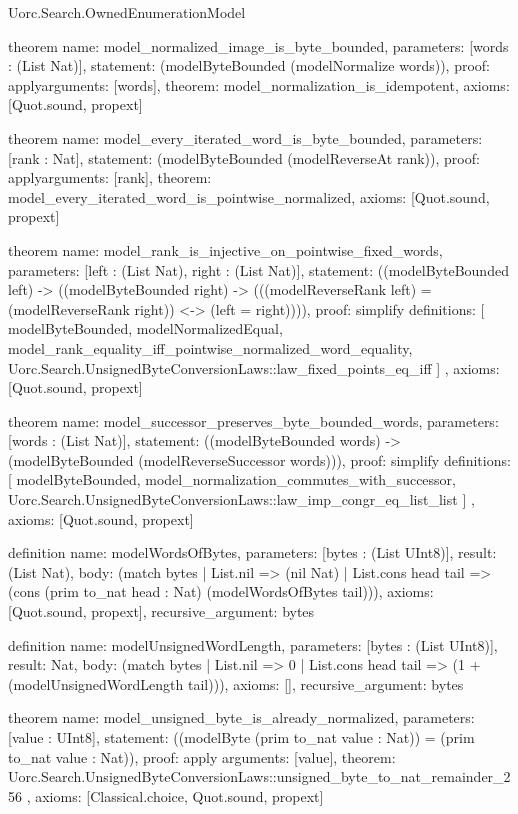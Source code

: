 \begin{lexlean}{Uorc.Search.OwnedEnumerationModel}
\begin{semanticmodule}
theorem{
  name: model_normalized_image_is_byte_bounded,
  parameters: [words : (List Nat)],
  statement: (modelByteBounded (modelNormalize words)),
  proof: apply{arguments: [words], theorem: model_normalization_is_idempotent},
  axioms: [Quot.sound, propext]
}

theorem{
  name: model_every_iterated_word_is_byte_bounded,
  parameters: [rank : Nat],
  statement: (modelByteBounded (modelReverseAt rank)),
  proof: apply{arguments: [rank], theorem: model_every_iterated_word_is_pointwise_normalized},
  axioms: [Quot.sound, propext]
}

theorem{
  name: model_rank_is_injective_on_pointwise_fixed_words,
  parameters: [left : (List Nat), right : (List Nat)],
  statement: ((modelByteBounded left) -> ((modelByteBounded right) -> (((modelReverseRank left) = (modelReverseRank right)) <-> (left = right)))),
  proof: simplify{
    definitions: [
      modelByteBounded,
      modelNormalizedEqual,
      model_rank_equality_iff_pointwise_normalized_word_equality,
      Uorc.Search.UnsignedByteConversionLaws::law_fixed_points_eq_iff
    ]
  },
  axioms: [Quot.sound, propext]
}

theorem{
  name: model_successor_preserves_byte_bounded_words,
  parameters: [words : (List Nat)],
  statement: ((modelByteBounded words) -> (modelByteBounded (modelReverseSuccessor words))),
  proof: simplify{
    definitions: [
      modelByteBounded,
      model_normalization_commutes_with_successor,
      Uorc.Search.UnsignedByteConversionLaws::law_imp_congr_eq_list_list
    ]
  },
  axioms: [Quot.sound, propext]
}

definition{
  name: modelWordsOfBytes,
  parameters: [bytes : (List UInt8)],
  result: (List Nat),
  body: (match bytes
    | List.nil => (nil Nat)
    | List.cons head tail => (cons (prim to_nat head : Nat) (modelWordsOfBytes tail))),
  axioms: [Quot.sound, propext],
  recursive_argument: bytes
}

definition{
  name: modelUnsignedWordLength,
  parameters: [bytes : (List UInt8)],
  result: Nat,
  body: (match bytes | List.nil => 0 | List.cons head tail => (1 + (modelUnsignedWordLength tail))),
  axioms: [],
  recursive_argument: bytes
}

theorem{
  name: model_unsigned_byte_is_already_normalized,
  parameters: [value : UInt8],
  statement: ((modelByte (prim to_nat value : Nat)) = (prim to_nat value : Nat)),
  proof: apply{
    arguments: [value],
    theorem: Uorc.Search.UnsignedByteConversionLaws::unsigned_byte_to_nat_remainder_256
  },
  axioms: [Classical.choice, Quot.sound, propext]
}


\end{semanticmodule}
\end{lexlean}
